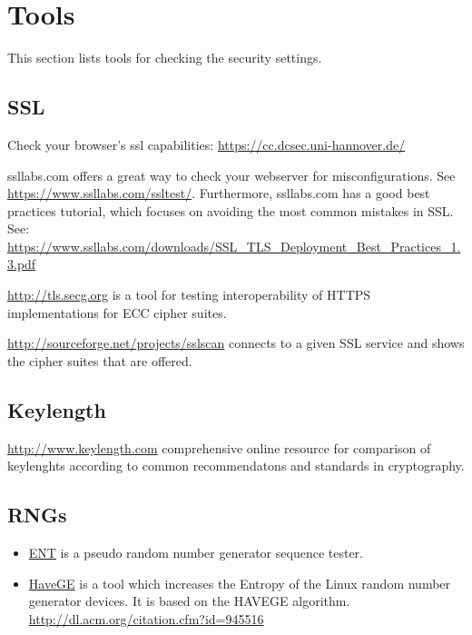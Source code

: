 \section{Tools}

This section lists tools for checking the security settings.

\subsection{SSL}

Check your browser's ssl capabilities: \url{https://cc.dcsec.uni-hannover.de/}


ssllabs.com offers a great way to check your webserver for misconfigurations. See \url{https://www.ssllabs.com/ssltest/}.
Furthermore, ssllabs.com has a good best practices tutorial, which focuses on avoiding the most common mistakes in SSL.
See: \url{https://www.ssllabs.com/downloads/SSL_TLS_Deployment_Best_Practices_1.3.pdf}

\url{http://tls.secg.org} is a tool for testing interoperability of HTTPS implementations for ECC cipher suites.

\url{http://sourceforge.net/projects/sslscan} connects to a given SSL
service and shows the cipher suites that are offered.

\subsection{Keylength}

\url{http://www.keylength.com} comprehensive online resource for comparison of keylenghts according to common recommendatons and standards in cryptography.

\subsection{RNGs}

\begin{itemize}
\item \href{http://www.fourmilab.ch/random/}{ENT} is a pseudo random number generator sequence tester.  
\item \href{http://www.issihosts.com/haveged/}{HaveGE} is a tool which increases the Entropy of the Linux random number generator devices. It is based on the HAVEGE algorithm. \url{http://dl.acm.org/citation.cfm?id=945516}
\end{itemize}



